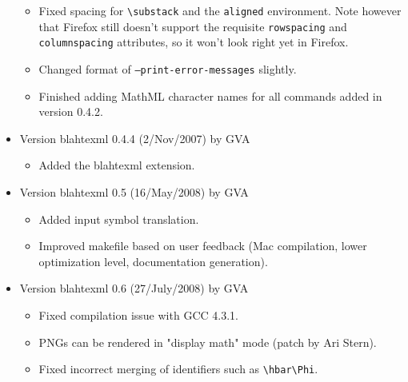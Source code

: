 \documentclass{article}
\newcommand{\texcommand}[1]{\textbackslash{}#1}
\begin{document}
\begin{itemize}
\begin{itemize}
\item Fixed spacing for \texttt{\texcommand{substack}} and the \texttt{aligned} environment. Note however that Firefox still doesn't support the requisite \texttt{rowspacing} and \texttt{columnspacing} attributes, so it won't look right yet in Firefox.
\item Changed format of \texttt{--print-error-messages} slightly.
\item Finished adding MathML character names for all commands added in version 0.4.2.
\end{itemize}
\item Version blahtexml 0.4.4 (2/Nov/2007) by GVA
\begin{itemize}
\item Added the blahtexml extension.
\end{itemize}
\item Version blahtexml 0.5 (16/May/2008) by GVA
\begin{itemize}
\item Added input symbol translation.
\item Improved makefile based on user feedback (Mac compilation, lower optimization level, documentation generation).
\end{itemize}
\item Version blahtexml 0.6 (27/July/2008) by GVA
\begin{itemize}
\item Fixed compilation issue with GCC 4.3.1.
\item PNGs can be rendered in "display math" mode (patch by Ari Stern).
\item Fixed incorrect merging of identifiers such as \verb|\hbar\Phi|.
\end{itemize}
\end{itemize}
\end{document}
